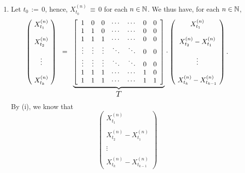 \begin{enumerate}
\item	Let $t_{0} \,:= \, 0$, hence, $X^{(n)}_{t_{0}} \,\equiv\, 0$ for each $n \in \mathbb{N}$.
		We thus have, for each $n \in \mathbb{N}$,
		\begin{equation*}
		\left(\!
		\begin{array}{c}
		X^{(n)}_{t_{1}} \\ \\ X^{(n)}_{t_{2}} \\ \\ \vdots \\ \\ X^{(n)}_{t_{k}} 
		\end{array}
		\!\right)
		\;\; = \;\;
		\underset{\textnormal{\large$T$}}{\underbrace{
		\left[
		\begin{array}{ccccccc}
		1 & 0 & 0 & \cdots & \cdots & 0 & 0 \\
		1 & 1 & 0 & \cdots & \cdots & 0 & 0 \\
		1 & 1 & 1 & \cdots & \cdots & 0 & 0 \\
		\vdots & \vdots & \vdots & \ddots & \ddots & 0 & 0 \\
		\vdots & \vdots & \vdots & \ddots & \ddots & 0 & 0 \\
		1 & 1 & 1 & \cdots & \cdots & 1 & 0 \\
		1 & 1 & 1 & \cdots & \cdots & 1 & 1 \\
		\end{array}
		\right]
		}}
		\cdot
		\left(\!
		\begin{array}{c}
		X^{(n)}_{t_{1}} \\ \\ X^{(n)}_{t_{2}} - X^{(n)}_{t_{1}} \\ \\ \vdots \\ \\ X^{(n)}_{t_{k}} - X^{(n)}_{t_{k-1}}
		\end{array}
		\!\right).
		\end{equation*}
		By (i), we know that
		\begin{equation*}
		\left(\!
		\begin{array}{c}
		X^{(n)}_{t_{1}} \\ \\ X^{(n)}_{t_{2}} - X^{(n)}_{t_{1}} \\ \\ \vdots \\ \\ X^{(n)}_{t_{k}} - X^{(n)}_{t_{k-1}}
		\end{array}
		\!\right)	

\end{equation*}
\end{enumerate}
